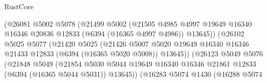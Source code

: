 \begin{lexlean}{RustCore}
\begin{coremodule}
                                      (@26081
                                        @5002
                                        @5078
                                        (@21499
                                          @5002
                                          (@21505
                                            @4985
                                            @4997
                                            @19649
                                            @16340
                                            @16346
                                            @20836
                                            @12833
                                            (@6394 (@16365 @4997 @4986))
                                            @13645))
                                        (@26102
                                          @5025
                                          @5077
                                          (@21420
                                            @5025
                                            (@21426
                                              @5007
                                              @5020
                                              @19649
                                              @16340
                                              @16346
                                              @21433
                                              @12833
                                              (@6394 (@16365 @5020 @5008))
                                              @13645))
                                          (@26123
                                            @5049
                                            @5076
                                            (@21848
                                              @5049
                                              (@21854
                                                @5030
                                                @5044
                                                @19649
                                                @16340
                                                @16346
                                                @21861
                                                @12833
                                                (@6394 (@16365 @5044 @5031))
                                                @13645))
                                            (@16283
                                              @5074
                                              @1430
                                              (@16288
                                                @5074

\end{coremodule}
\end{lexlean}

